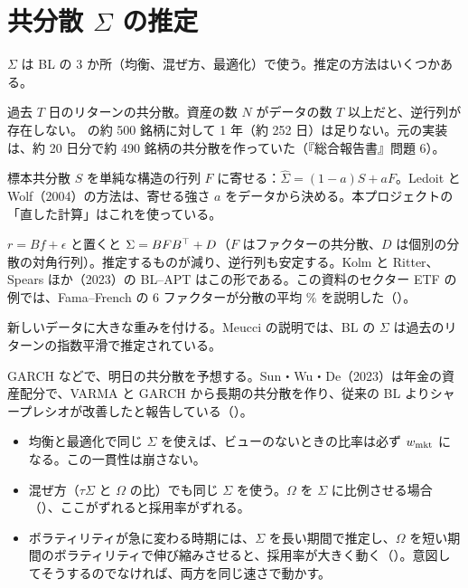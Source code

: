 \section{共分散 $\Sigma$ の推定}\label{sec:cov}

$\Sigma$ は BL の 3 か所（均衡、混ぜ方、最適化）で使う。推定の方法はいくつかある。

\begin{description}[leftmargin=2em,style=nextline]
\item[標本共分散] 過去 $T$ 日のリターンの共分散。資産の数 $N$ がデータの数 $T$ 以上だと、逆行列が存在しない。\SP{} の約 500 銘柄に対して 1 年（約 252 日）は足りない。元の実装は、約 20 日分で約 490 銘柄の共分散を作っていた（『総合報告書』問題 6）。
\item[縮小推定] 標本共分散 $S$ を単純な構造の行列 $F$ に寄せる：$\hat\Sigma=(1-a)S+aF$。Ledoit と Wolf（2004）の方法は、寄せる強さ $a$ をデータから決める。本プロジェクトの「直した計算」はこれを使っている。
\item[ファクターモデル] $r=Bf+\epsilon$ と置くと $\Sigma=BFB^{\top}+D$（$F$ はファクターの共分散、$D$ は個別の分散の対角行列）。推定するものが減り、逆行列も安定する。Kolm と Ritter、Spears ほか（2023）の BL--APT はこの形である。この資料のセクター ETF の例では、Fama--French の 6 ファクターが分散の平均 \% を説明した（）。
\item[指数加重] 新しいデータに大きな重みを付ける。Meucci の説明では、BL の $\Sigma$ は過去のリターンの指数平滑で推定されている。
\item[時変の共分散] GARCH などで、明日の共分散を予想する。Sun・Wu・De（2023）は年金の資産配分で、VARMA と GARCH から長期の共分散を作り、従来の BL よりシャープレシオが改善したと報告している（）。
\end{description}

\begin{tipbox}
\begin{itemize}
\item 均衡と最適化で同じ $\Sigma$ を使えば、ビューのないときの比率は必ず $w_{\mathrm{mkt}}$ になる。この一貫性は崩さない。
\item 混ぜ方（$\tau\Sigma$ と $\Omega$ の比）でも同じ $\Sigma$ を使う。$\Omega$ を $\Sigma$ に比例させる場合（）、ここがずれると採用率がずれる。
\item ボラティリティが急に変わる時期には、$\Sigma$ を長い期間で推定し、$\Omega$ を短い期間のボラティリティで伸び縮みさせると、採用率が大きく動く（）。意図してそうするのでなければ、両方を同じ速さで動かす。
\end{itemize}
\end{tipbox}

